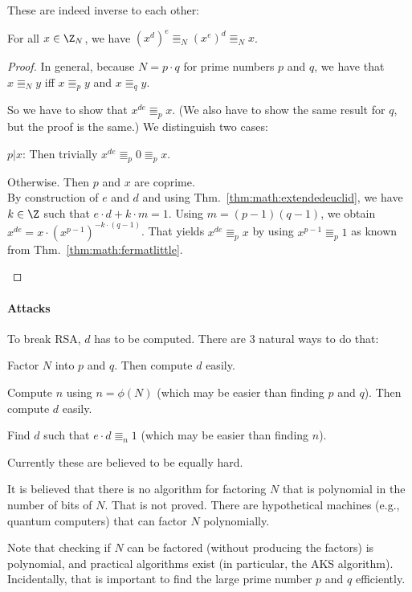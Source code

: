 These are indeed inverse to each other:

\begin{theorem}
For all $x\in \Z_N$, we have $(x^d)^e\Equiv_N (x^e)^d \Equiv_N x$.
\end{theorem}
\begin{proof}
In general, because $N=p\cdot q$ for prime numbers $p$ and $q$, we have that $x\Equiv_N y$ iff $x\Equiv_p y$ and $x\Equiv_q y$.

So we have to show that $x^{de}\Equiv_p x$.
(We also have to show the same result for $q$, but the proof is the same.)
We distinguish two cases:
\begin{compactitem}
\item $p|x$: Then trivially $x^{de}\Equiv_p 0\Equiv_p x$.
\item Otherwise. Then $p$ and $x$ are coprime.\\
   By construction of $e$ and $d$ and using Thm.~\ref{thm:math:extendedeuclid}, we have $k\in\Z$ such that $e\cdot d+k\cdot m=1$.
   Using $m=(p-1)(q-1)$, we obtain $x^{de}=x\cdot (x^{p-1})^{-k\cdot(q-1)}$.
   That yields $x^{de}\Equiv_p x$ by using $x^{p-1}\Equiv_p 1$ as known from Thm.~\ref{thm:math:fermatlittle}.
\end{compactitem}
\end{proof}

\paragraph{Attacks}
To break RSA, $d$ has to be computed.
There are $3$ natural ways to do that:
\begin{compactitem}
 \item Factor $N$ into $p$ and $q$. Then compute $d$ easily.
 \item Compute $n$ using $n=\phi(N)$ (which may be easier than finding $p$ and $q$). Then compute $d$ easily.
 \item Find $d$ such that $e\cdot d\Equiv_n 1$ (which may be easier than finding $n$).
\end{compactitem}
Currently these are believed to be equally hard.

It is believed that there is no algorithm for factoring $N$ that is polynomial in the number of bits of $N$.
That is not proved.
There are hypothetical machines (e.g., quantum computers) that can factor $N$ polynomially.

Note that checking if $N$ can be factored (without producing the factors) is polynomial, and practical algorithms exist (in particular, the AKS algorithm).
Incidentally, that is important to find the large prime number $p$ and $q$ efficiently.
\medskip

